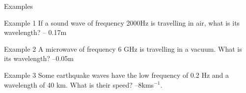 \documentclass[../Main.tex]{subfiles}
\begin{document}
\begin{frame}{Examples}
    \begin{exampleblock}{Example 1}
    If a sound wave of frequency 2000Hz is travelling in air, what is its wavelength? \pause
    -- 0.17m
    \end{exampleblock}\pause
    \begin{exampleblock}{Example 2}
    A microwave of frequency 6 GHz is travelling in a vacuum. What is its wavelength? \pause
    --0.05m
    \end{exampleblock}\pause
    \begin{exampleblock}{Example 3}
    Some earthquake waves have the low frequency of 0.2 Hz and a wavelength of 40 km. What is their speed? \pause
    --8kms$^{-1}$.
    \end{exampleblock}
\end{frame}
\end{document}
